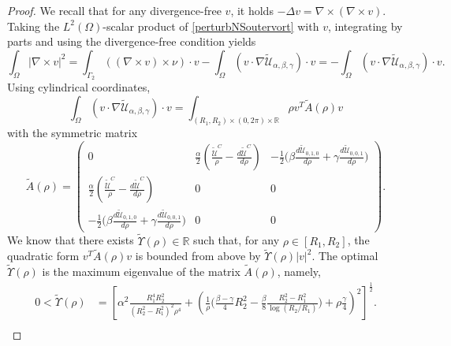 \documentclass[a4paper,11pt]{amsart}
\numberwithin{equation}{section}
\numberwithin{figure}{section}
\def\U{{\mathcal U}}
\begin{document}
\begin{proof}
	We recall that for any divergence-free $v$, it holds $-\Delta v=\nabla\times(\nabla \times v)$.
	Taking the $L^2(\Omega)$-scalar product of \eqref{perturbNSoutervort} with $v$, integrating by parts and using the divergence-free condition yields
	\begin{equation}\label{dirnorm-vort}
		\int_\Omega |\nabla\times v|^2  = \int_{\Gamma_2} ((\nabla\times v)\times \nu)\cdot v- \int_{\Omega}\left(v\cdot \nabla \widetilde{\U}_{\alpha,\beta,\gamma}\right) \cdot v=- \int_{\Omega}\left(v\cdot \nabla \widetilde{\U}_{\alpha,\beta,\gamma}\right) \cdot v.
	\end{equation}
	Using cylindrical coordinates,
	\begin{equation}\label{eq:nonlineartermenergy}
		\int_\Omega (	v\cdot \nabla \widetilde{\U}_{\alpha,\beta,\gamma} )\cdot v = \int_{(R_1,R_2)\times (0,2\pi)\times \mathbb{R}}\rho v^T\widetilde{A}(\rho)v
	\end{equation}
	with the symmetric matrix
	\begin{equation}\label{Arho2}
		\widetilde{A}(\rho)=\left( \begin{matrix}
			0& \tfrac{\alpha}{2}(\frac{ \widetilde{\U}^C}{\rho}-\frac{d  \widetilde{\U}^C}{d\rho})&	-\tfrac{1}{2}\big(\beta\frac{d\widetilde \U_{0,1,0}}{d\rho}+\gamma\frac{d\widetilde \U_{0,0,1}}{d\rho}\big)\\[5pt]
			\tfrac{\alpha}{2}(\frac{ \widetilde{\U}^C}{\rho}-\frac{d  \widetilde{\U}^C}{d\rho})&0&0\\[5pt]
			-\tfrac{1}{2}\big(\beta\frac{d\widetilde \U_{0,1,0}}{d\rho}+\gamma\frac{d\widetilde \U_{0,0,1}}{d\rho}\big)&0&0
		\end{matrix}\right).
	\end{equation}
	We know that there exists $\widetilde\Upsilon(\rho)\in \mathbb{R}$ such that, for any $\rho\in [R_1,R_2]$, the quadratic form $v^T \widetilde A(\rho) v $ is bounded from above by $\widetilde\Upsilon(\rho) |v|^2 $. The optimal $\widetilde\Upsilon(\rho)$ is the maximum eigenvalue of the matrix $\widetilde A(\rho)$, namely,
	\begin{equation*}\begin{aligned}
			0<	\widetilde\Upsilon(\rho)&= 
            \left[\alpha^2 \frac{R_1^4R_2^2}{(R_2^2 -R_1^2)^2\rho^4} +\left(\frac{1}{\rho}\bigg(\frac{\beta-\gamma}{4}R_2^2-\frac{\beta}{8}\frac{R_2^2-R_1^2}{\log(R_2/R_1)}\bigg)+\rho\frac{\gamma}{4} \right)^2\right]^{\frac{1}{2}}.\\[5pt]
		\end{aligned}
	\end{equation*}

\end{proof}
\end{document}
